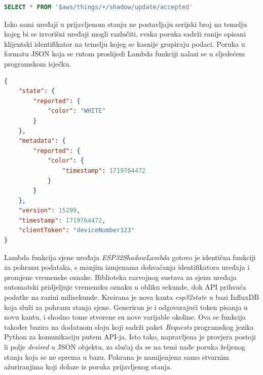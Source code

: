 \begin{lstlisting}[caption={SQL upit rute za sjene uređaja}, language=sql]
	SELECT * FROM '$aws/things/+/shadow/update/accepted'
\end{lstlisting}

Iako sami uređaji u prijavljenom stanju ne postavljaju serijski broj na temelju kojeg bi se izvorišni uređaji mogli razlučiti, svaka poruka sadrži ranije opisani klijentski identifikator na temelju kojeg se kasnije grupiraju podaci. Poruka u formatu JSON koja se rutom proslijedi Lambda funkciji nalazi se u sljedećem programskom isječku. 

\begin{lstlisting}[caption={Poruka ažurirane sjene}, language=json]
{
	"state": {
		"reported": {
			"color": "WHITE"
		}
	},
	"metadata": {
		"reported": {
			"color": {
				"timestamp": 1719764472
			}
		}
	},
	"version": 15299,
	"timestamp": 1719764472,
	"clientToken": "deviceNumber123"
}
\end{lstlisting}

Lambda funkcija sjene uređaja \textit{ESP32ShadowLambda} gotovo je identična funkciji za pohranu podataka, s manjim izmjenama dohvaćanja identifikatora uređaja i promjene vremenske oznake. Biblioteka razvojnog sustava za sjenu uređaja automatski pridjeljuje vremensku oznaku u obliku sekunde, dok API prihvaća podatke na razini milisekunde. Kreirana je nova kanta \textit{esp32state} u bazi InfluxDB koja služi za pohranu stanja sjene. Generiran je i odgovarajući token pisanja u novu kantu, i shodno tome stvorene su nove varijable okoline. Ova se funkcija također bazira na dodatnom sloju koji sadrži paket \textit{Requests} programskog jezika Python za komunikaciju putem API-ja. Isto tako, napravljena je provjera postoji li polje \textit{desired} u JSON objektu, za slučaj da se na temi nađe poruka željenog stanja koja se ne sprema u bazu. Pohrana je namijenjena samo stvarnim ažuriranjima koji dolaze iz poruka prijavljenog stanja.

